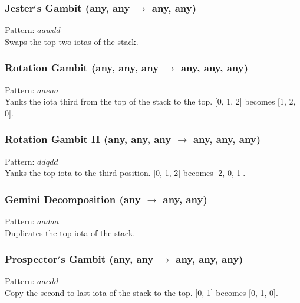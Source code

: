 \documentclass[12pt]{article}
\begin{document}
  \label{sec: patterns/stackmanip@hexcasting:swap}
\subsubsection*{Jester$\rq$s Gambit (any, any $\rightarrow$ any, any)}

    Pattern: $aawdd$\\
      Swaps the top two iotas of the stack.\\


  \label{sec: patterns/stackmanip@hexcasting:rotate}
\subsubsection*{Rotation Gambit (any, any, any $\rightarrow$ any, any, any)}

    Pattern: $aaeaa$\\
      Yanks the iota third from the top of the stack to the top. [0, 1, 2] becomes [1, 2, 0].\\


  \label{sec: patterns/stackmanip@hexcasting:rotate_reverse}
\subsubsection*{Rotation Gambit II (any, any, any $\rightarrow$ any, any, any)}

    Pattern: $ddqdd$\\
      Yanks the top iota to the third position. [0, 1, 2] becomes [2, 0, 1].\\


  \label{sec: patterns/stackmanip@hexcasting:duplicate}
\subsubsection*{Gemini Decomposition (any $\rightarrow$ any, any)}

    Pattern: $aadaa$\\
      Duplicates the top iota of the stack.\\


  \label{sec: patterns/stackmanip@hexcasting:over}
\subsubsection*{Prospector$\rq$s Gambit (any, any $\rightarrow$ any, any, any)}

    Pattern: $aaedd$\\
      Copy the second-to-last iota of the stack to the top. [0, 1] becomes [0, 1, 0].\\
\end{document}
